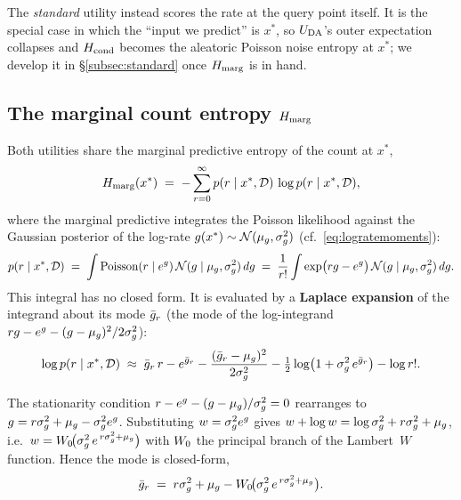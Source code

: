 The \emph{standard} utility instead scores the rate at the query point itself. It
is the special case in which the ``input we predict'' is $x^{*}$, so $U_{\mathrm{DA}}$'s outer
expectation collapses and $H_{\mathrm{cond}}$ becomes the aleatoric Poisson noise entropy at
$x^{*}$; we develop it in \S\ref{subsec:standard} once $H_{\mathrm{marg}}$ is in hand.

\subsection{The marginal count entropy \texorpdfstring{$H_{\mathrm{marg}}$}{H\_marg}}
\label{subsec:hmarg}

Both utilities share the marginal predictive entropy of the count at $x^{*}$,
%
\begin{equation}
  H_{\mathrm{marg}}(x^{*})
  \;=\; -\sum_{r=0}^{\infty} p(r\mid x^{*},\mathcal D)\,\log p(r\mid x^{*},\mathcal D),
  \label{eq:Hmarg}
\end{equation}
%
where the marginal predictive integrates the Poisson likelihood against the
Gaussian posterior of the log-rate $g(x^{*})\sim\mathcal{N}(\mu_{g},\sigma_{g}^{2})$
(cf.~\eqref{eq:logratemoments}):
%
\begin{equation}
  p(r\mid x^{*},\mathcal D)
  \;=\; \int \mathrm{Poisson}(r\mid e^{g})\,\mathcal{N}(g\mid\mu_{g},\sigma_{g}^{2})\,dg
  \;=\; \frac{1}{r!}\int \exp\!\big(rg - e^{g}\big)\,\mathcal{N}(g\mid\mu_{g},\sigma_{g}^{2})\,dg .
  \label{eq:marg-predictive}
\end{equation}
%
This integral has no closed form. It is evaluated by a \textbf{Laplace expansion} of
the integrand about its mode $\bar{g}_{r}$ (the mode of the log-integrand
$rg - e^{g} - (g-\mu_{g})^{2}/2\sigma_{g}^{2}$):
%
\begin{equation}
  \log p(r\mid x^{*},\mathcal D)
  \;\approx\;
  \bar{g}_{r}\,r - e^{\bar{g}_{r}}
  - \frac{(\bar{g}_{r}-\mu_{g})^{2}}{2\sigma_{g}^{2}}
  - \tfrac12\log\!\big(1+\sigma_{g}^{2}\,e^{\bar{g}_{r}}\big)
  - \log r! .
  \label{eq:laplace-logp}
\end{equation}

\begin{lemma}\label{lem:mode}
The stationarity condition $r-e^{g}-(g-\mu_{g})/\sigma_{g}^{2}=0$ rearranges to
$g=r\sigma_{g}^{2}+\mu_{g}-\sigma_{g}^{2} e^{g}$. Substituting $w=\sigma_{g}^{2} e^{g}$ gives
$w+\log w=\log\sigma_{g}^{2}+r\sigma_{g}^{2}+\mu_{g}$, i.e.\ $w=W_{0}\!\big(\sigma_{g}^{2}\,e^{\,r\sigma_{g}^{2}+\mu_{g}}\big)$
with $W_{0}$ the principal branch of the Lambert~$W$ function. Hence the mode is
closed-form,
%
\begin{equation}
  \bar{g}_{r} \;=\; r\sigma_{g}^{2}+\mu_{g}-W_{0}\!\big(\sigma_{g}^{2}\,e^{\,r\sigma_{g}^{2}+\mu_{g}}\big).
  \label{eq:laplace-mode}
\end{equation}
\end{lemma}

